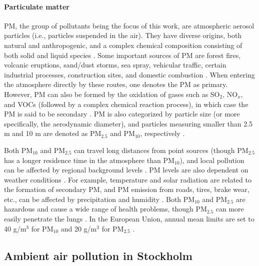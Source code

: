 \paragraph{Particulate matter}
PM, the group of pollutants being the focus of this work, are atmospheric aerosol particles (i.e., particles suspended in the air). They have diverse origins, both natural and anthropogenic, and a complex chemical composition consisting of both solid and liquid species \cite{Schwarzenbach2016}. Some important sources of PM are forest fires, volcanic eruptions, sand/dust storms, sea spray, vehicular traffic, certain industrial processes, construction sites, and domestic combustion \cite{Querol2004, Schwarzenbach2016}. When entering the atmosphere directly by these routes, one denotes the PM as primary. However, PM can also be formed by the oxidation of gases such as SO$_2$, NO$_x$, and VOCs (followed by a complex chemical reaction process), in which case the PM is said to be secondary \cite{Schwarzenbach2016}. PM is also categorized by particle size (or more specifically, the aerodynamic diameter), and particles measuring smaller than 2.5 \textmugreek m and 10 \textmugreek m are denoted as PM$_{2.5}$ and PM$_{10}$, respectively \cite{Schwarzenbach2016}.

Both PM$_{10}$ and PM$_{2.5}$ can travel long distances from point sources (though PM$_{2.5}$ has a longer residence time in the atmosphere than PM$_{10}$), and local pollution can be affected by regional background levels \cite{Schwarzenbach2016, slbanalys}. PM levels are also dependent on weather conditions \cite{Schwarzenbach2016}. For example, temperature and solar radiation are related to the formation of secondary PM, and PM emission from roads, tires, brake wear, etc., can be affected by precipitation and humidity \cite{slbanalys, atmos7020015}. Both PM$_{10}$ and PM$_{2.5}$ are hazardous and cause a wide range of health problems, though PM$_{2.5}$ can more easily penetrate the lungs \cite{Schwarzenbach2016}. In the European Union, annual mean limits are set to 40 \textmugreek g/m$^3$ for PM$_{10}$ and 20 \textmugreek g/m$^3$ for PM$_{2.5}$ \cite{eu-airquality}. 

\subsection{Ambient air pollution in Stockholm}
\label{air-pollution-stockholm}

